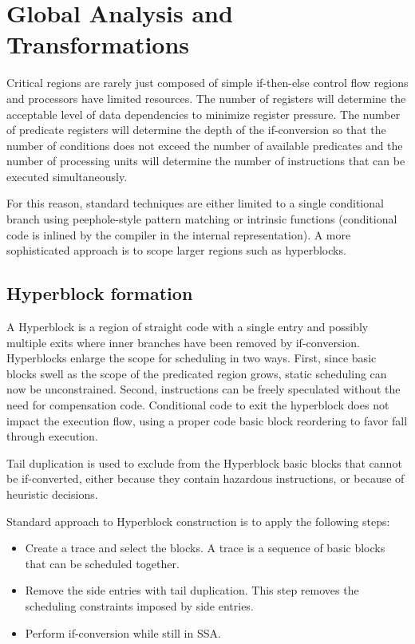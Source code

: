\section{Global Analysis and Transformations}
\label{sec:if_conversion:hyperblock}
Critical regions are rarely just composed of simple if-then-else control flow regions and processors have limited resources. The number of registers will determine the acceptable level of data dependencies to minimize register pressure. The number of predicate registers will determine the depth of the if-conversion so that the number of conditions does not exceed the number of available predicates and the number of processing units will determine the number of instructions that can be executed simultaneously. 

For this reason, standard techniques are either limited to a single conditional branch using peephole-style pattern matching or intrinsic functions (conditional code is inlined by the compiler in the internal representation). A more sophisticated approach is to scope larger regions such as hyperblocks. 

\subsection{Hyperblock formation}

A Hyperblock is a region of straight code with a single entry and possibly multiple exits where inner branches have been removed by if-conversion.
Hyperblocks enlarge the scope for scheduling in two ways. First, since basic blocks swell as the scope of the predicated region grows, static scheduling can now be unconstrained. Second, instructions can be freely speculated without the need for compensation code. Conditional code to exit the hyperblock does not impact the execution flow, using a proper code basic block reordering to favor fall through execution.

Tail duplication is used to exclude from the Hyperblock basic blocks that cannot be if-converted, either because they contain hazardous instructions, or because of heuristic decisions. 

Standard approach to Hyperblock construction is to apply the following steps:

\begin{itemize}
\item Create a trace and select the blocks. A trace is a sequence of basic blocks that can be scheduled together. 
\item Remove the side entries with tail duplication. This step removes the scheduling constraints imposed by side entries.
\item Perform if-conversion while still in SSA.
\end{itemize}

